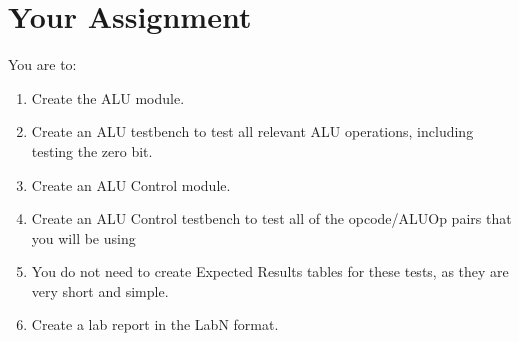 \section{Your Assignment}

You are to:
\begin{enumerate}
\item Create the ALU module.
\item Create an ALU testbench to test all relevant ALU operations, including testing the zero bit.
\item Create an ALU Control module.
\item Create an ALU Control testbench to test all of the opcode/ALUOp pairs that you will be using
\item You do not need to create Expected Results tables for these tests, as they are very short and simple.
\item Create a lab report in the LabN format.
\end{enumerate} 